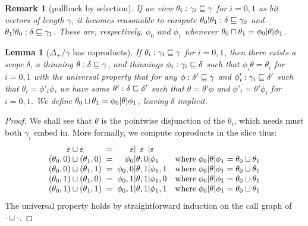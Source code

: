 \documentclass{jfp1}
\newtheorem{lemma}[theorem]{Lemma}
\newtheorem{remark}[theorem]{Remark}
\newcommand{\emp}{\varepsilon}
\begin{document}
\begin{remark}[pullback by selection]
  If we view $\theta_i : \gamma_i\sqsubseteq\gamma$ for $i=0,1$ as bit
  vectors of length $\gamma$, it
  becomes reasonable to compute $\theta_0!\theta_1 :
  \delta\sqsubseteq\gamma_0$
  and $\theta_1!\theta_0 : \delta\sqsubseteq\gamma_1$. These are,
  respectively, $\phi_0$ and $\phi_1$ whenever
  $\theta_0 \sqcap \theta_1 = \phi_0 | \theta | \phi_1$.
\end{remark}

\begin{lemma}[$\Delta_+/\gamma$ has coproducts]
  If $\theta_i : \gamma_i\sqsubseteq\gamma$ for $i=0,1$, then there exists a
  scope $\delta$, a thinning $\theta : \delta\sqsubseteq\gamma$, and
  thinnings $\phi_i : \gamma_i\sqsubseteq\delta$ such that
  $\phi_i\theta = \theta_i$  for $i=0,1$ with the universal property that
  for any $\phi:\delta'\sqsubseteq\gamma$ and $\phi'_i : \gamma_i\sqsubseteq\delta'$ such that
  $\theta_i = \phi'_i\phi$, we have some $\theta' :
  \delta\sqsubseteq\delta'$ such that
  $\theta=\theta'\phi$ and
  $\phi'_i = \theta'\phi_i$ for $i=0,1$. We define
  $\theta_0 \sqcup \theta_1 = \phi_0 | \theta | \phi_1$,
  leaving $\delta$ implicit.
\end{lemma}
\begin{proof}
  We shall see that $\theta$ is the pointwise disjunction of the $\theta_i$,
  which needs must both $\gamma_i$ embed in. More formally, we compute
  coproducts in the slice thus:
  \[\begin{array}{c@{\;\;=\;\;}r@{|}c@{|}ll}
    \cp{\emp}{\emp} & \emp&\emp&\emp & \\
    \cp{(\theta_0,0)}{(\theta_1,0)} & \phi_0&\theta,0&\phi_1
      & \mbox{where}\;\phi_0|\theta|\phi_1 = \cp{\theta_0}{\theta_1} \\                                     
    \cp{(\theta_0,0)}{(\theta_1,1)} & \phi_0,0&\theta,1&\phi_1,1
      & \mbox{where}\;\phi_0|\theta|\phi_1 = \cp{\theta_0}{\theta_1} \\
    \cp{(\theta_0,1)}{(\theta_1,0)} & \phi_0,1&\theta,1&\phi_1,0
      & \mbox{where}\;\phi_0|\theta|\phi_1 = \cp{\theta_0}{\theta_1} \\
    \cp{(\theta_0,1)}{(\theta_1,1)} & \phi_0,1&\theta,1&\phi_1,1
      & \mbox{where}\;\phi_0|\theta|\phi_1 = \cp{\theta_0}{\theta_1} \\
    \end{array}\]
  The universal property holds by straightforward induction on the call graph
  of $\cdot \sqcup \cdot$.
\end{proof}
\end{document}
